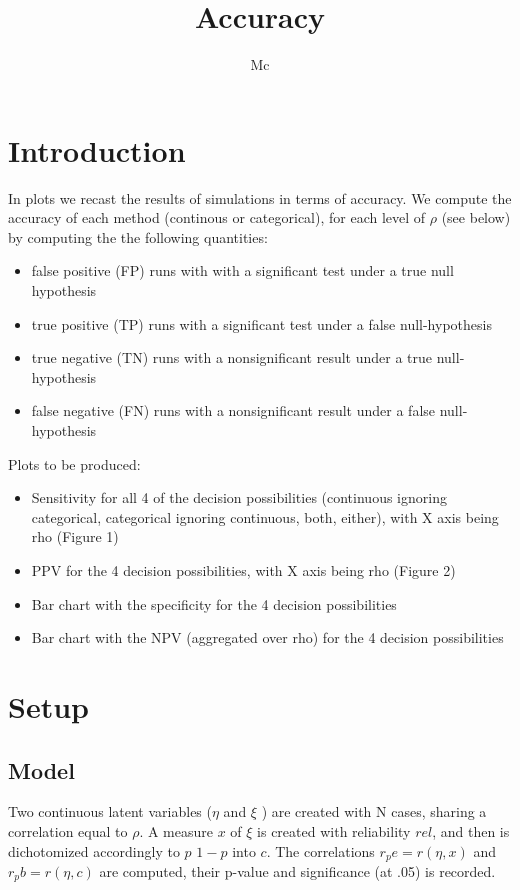 \documentclass{article}
\begin{document}


\title{Accuracy}

\author{Mc}
\maketitle
\section*{Introduction}
In plots we recast the results of simulations in terms of accuracy. We compute the accuracy of each method (continous or categorical), for each level of \(\rho\) (see below) by computing the  the following quantities:
\begin{itemize}
  \item false positive (FP)  runs with  with a significant test under a true null hypothesis
  \item true positive (TP) runs with a significant test under a false null-hypothesis 
  \item true negative (TN) runs  with a nonsignificant result under a true null-hypothesis
  \item false negative (FN) runs with a nonsignificant result under a false null-hypothesis

\end{itemize}

Plots to be produced:
\begin{itemize}
  \item Sensitivity for all 4 of the decision possibilities (continuous ignoring categorical, categorical ignoring continuous, both, either), with X axis being rho (Figure 1)
  \item PPV for the 4 decision possibilities, with X axis being rho (Figure 2)
  \item Bar chart with the specificity for the 4 decision possibilities
  \item Bar chart with the NPV (aggregated over rho) for the 4 decision possibilities
\end{itemize}

\section*{Setup}
\subsection*{Model}
Two continuous latent variables (\(\eta\) and \(\xi\) ) are created with N cases, sharing a correlation equal to \(\rho\). A measure \(x\) of \(\xi\) is created with reliability \(rel\), and then  is dichotomized accordingly to \(p\) \(1-p\) into \(c\). The correlations \( r_pe=r(\eta,x) \)  and \( r_pb=r(\eta,c) \) are computed, their p-value and significance (at .05) is recorded.
\end{document}
